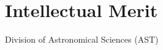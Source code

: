 \documentclass[oneside,11pt]{amsart}
\newcommand{\comment}[2][todo]{{\color{#1}[[{\bf #2}]]}}
\begin{document}

\begin{center}

\vspace*{-1.5cm}



\end{center}

\vspace*{-0.3cm}









\section{Intellectual Merit}
\label{sec:im}
Division of Astronomical Sciences (AST)
\end{document}
